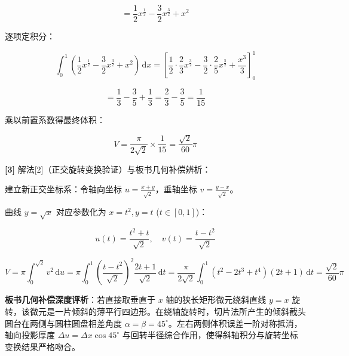 \documentclass[11pt,a4paper,UTF8]{ctexart}
\begin{document}
\begin{solbox}[分步推导与答题规范]
\begin{equation*}
= \frac{1}{2}x^{\frac{1}{2}} - \frac{3}{2}x^{\frac{3}{2}} + x^2
\end{equation*}


逐项定积分：


\begin{equation*}
\int_0^1 \left(\frac{1}{2}x^{\frac{1}{2}} - \frac{3}{2}x^{\frac{3}{2}} + x^2\right)\,\mathrm{d}x = \left[\frac{1}{2} \cdot \frac{2}{3}x^{\frac{3}{2}} - \frac{3}{2} \cdot \frac{2}{5}x^{\frac{5}{2}} + \frac{x^3}{3}\right]_0^1
\end{equation*}



\begin{equation*}
= \frac{1}{3} - \frac{3}{5} + \frac{1}{3} = \frac{2}{3} - \frac{3}{5} = \frac{1}{15}
\end{equation*}


乘以前置系数得最终体积：


\begin{equation*}
V = \frac{\pi}{2\sqrt{2}} \times \frac{1}{15} = \frac{\sqrt{2}}{60}\pi
\end{equation*}


\textbf{[3]} 解法[2]（正交旋转变换验证）与板书几何补偿辨析：

建立新正交坐标系：令轴向坐标 $u = \frac{x+y}{\sqrt{2}}$，垂轴坐标 $v = \frac{y-x}{\sqrt{2}}$。

曲线 $y = \sqrt{x}$ 对应参数化为 $x = t^2, y = t$ ($t \in [0, 1]$)：


\begin{equation*}
u(t) = \frac{t^2+t}{\sqrt{2}}, \quad v(t) = \frac{t-t^2}{\sqrt{2}}
\end{equation*}



\begin{equation*}
V = \pi \int_0^{\sqrt{2}} v^2\,\mathrm{d}u = \pi \int_0^1 \left(\frac{t-t^2}{\sqrt{2}}\right)^2 \frac{2t+1}{\sqrt{2}}\,\mathrm{d}t = \frac{\pi}{2\sqrt{2}} \int_0^1 (t^2-2t^3+t^4)(2t+1)\,\mathrm{d}t = \frac{\sqrt{2}}{60}\pi
\end{equation*}


\textbf{板书几何补偿深度评析}：若直接取垂直于 $x$ 轴的狭长矩形微元绕斜直线 $y=x$ 旋转，该微元是一片倾斜的薄平行四边形。在绕轴旋转时，切片法所产生的倾斜截头圆台在两侧与圆柱圆盘相差角度 $\alpha = \beta = 45^\circ$。左右两侧体积误差一阶对称抵消，轴向投影厚度 $\Delta u = \Delta x \cos 45^\circ$ 与回转半径综合作用，使得斜轴积分与旋转坐标变换结果严格吻合。
\end{solbox}
\end{document}
